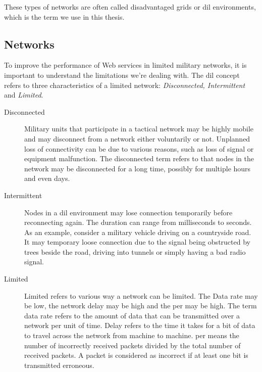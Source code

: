 These types of networks are often called disadvantaged grids or \gls{dil}
environments, which is the term we use in this thesis.

\subsection{ Networks}
\label{dil}

To improve the performance of Web services in limited military networks, it is
important to understand the limitations we're dealing with. The \gls{dil}
concept refers to three characteristics of a limited network: \textit{Disconnected, Intermittent} and \textit{Limited}.

\begin{description}
\item[Disconnected]

Military units that participate in a tactical network may be highly mobile and
may disconnect from a network either voluntarily or not. Unplanned loss of
connectivity can be due to various reasons, such as loss of signal or equipment
malfunction.  The disconnected term refers to that nodes in the network may be
disconnected for a long time, possibly for multiple hours and even days.

\item[Intermittent]

Nodes in a \gls{dil} environment may lose connection temporarily before
reconnecting again. The duration can range from milliseconds to seconds. As an
example, consider a military vehicle driving on a countryside road. It may
temporary loose connection due to the signal being obstructed by trees beside
the road, driving into tunnels or simply having a bad radio signal.

\item[Limited] Limited refers to various way a network can be limited. The Data
rate may be low, the network delay may be high and the \gls{per} may be high.
The term data rate refers to the amount of data that can be transmitted over a
network per unit of time. Delay refers to the time it takes for a bit of data to
travel across the network from machine to machine. \gls{per} means the number of
incorrectly received packets divided by the total number of received packets. A
packet is considered as incorrect if at least one bit is transmitted erroneous.


\end{description}

